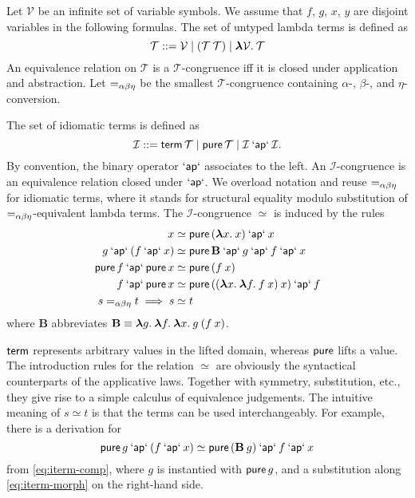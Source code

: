 \begin{definition}
Let $\mathcal{V}$ be an infinite set of variable symbols.
We assume that $f$, $g$, $x$, $y$ are disjoint variables in the following
formulas.
The set of untyped lambda terms is defined as
\begin{equation}
	\mathcal{T} ::= \mathcal{V} \mid (\mathcal{T} \> \mathcal{T}) \mid
		{\boldsymbol\lambda} \mathcal{V}.\>\mathcal{T}
\end{equation}
An equivalence relation on $\mathcal{T}$ is a $\mathcal{T}$-congruence iff it
is closed under application and abstraction.
Let $=_{\alpha\beta\eta}$ be the smallest $\mathcal{T}$-congruence containing $\alpha$-,
$\beta$-, and $\eta$-conversion.
\end{definition}

\begin{definition}\label{def:idiomatic-terms}
The set of idiomatic terms is defined as
\begin{equation}
	\mathcal{I} ::= \operatorname{\mathsf{term}} \mathcal{T} \mid \operatorname{\mathsf{pure}} \mathcal{T} \mid
		\mathcal{I} \mathbin{\mathsf{`ap`}} \mathcal{I}.
\end{equation}
By convention, the binary operator $\mathbin{\mathsf{`ap`}}$ associates to the left.
An $\mathcal{I}$-congruence is an equivalence relation closed under $\mathbin{\mathsf{`ap`}}$.
We overload notation and reuse $=_{\alpha\beta\eta}$ for idiomatic terms, where it stands
for structural equality modulo substitution of $=_{\alpha\beta\eta}$-equivalent lambda
terms.
The $\mathcal{I}$-congruence $\simeq$ is induced by the rules
\begin{align}
	x &\simeq \operatorname{\mathsf{pure}}{({\boldsymbol\lambda} x.\>x)} \mathbin{\mathsf{`ap`}} x \label{eq:iterm-id}\\
	g \mathbin{\mathsf{`ap`}} (f \mathbin{\mathsf{`ap`}} x) &\simeq \operatorname{\mathsf{pure}} \mathbf{B} \mathbin{\mathsf{`ap`}} g \mathbin{\mathsf{`ap`}} f \mathbin{\mathsf{`ap`}} x \label{eq:iterm-comp}\\
	\operatorname{\mathsf{pure}} f \mathbin{\mathsf{`ap`}} \operatorname{\mathsf{pure}} x &\simeq \operatorname{\mathsf{pure}}{(f \> x)} \label{eq:iterm-morph}\\
	f \mathbin{\mathsf{`ap`}} \operatorname{\mathsf{pure}} x &\simeq \operatorname{\mathsf{pure}}{(({\boldsymbol\lambda} x.\>{\boldsymbol\lambda} f.\>f \> x) \> x)} \mathbin{\mathsf{`ap`}} f \label{eq:iterm-xchng}\\
	s =_{\alpha\beta\eta} t \implies s &\simeq t \label{eq:termeq-lift}
\end{align}
where $\mathbf{B}$ abbreviates
$\mathbf{B} \equiv {\boldsymbol\lambda} g.\>{\boldsymbol\lambda} f.\>{\boldsymbol\lambda} x.\>g \> (f \> x)$.
\end{definition}

$\operatorname{\mathsf{term}}$ represents arbitrary values in the lifted domain, whereas $\operatorname{\mathsf{pure}}$
lifts a value.
The introduction rules for the relation $\simeq$ are obviously the syntactical
counterparts of the applicative laws.
Together with symmetry, substitution, etc., they give rise to a simple
calculus of equivalence judgements.
The intuitive meaning of $s \simeq t$ is that the terms can be used
interchangeably.
For example, there is a derivation for
\begin{equation}\label{eq:pure-rotate}
	\operatorname{\mathsf{pure}} g \mathbin{\mathsf{`ap`}} (f \mathbin{\mathsf{`ap`}} x) \simeq \operatorname{\mathsf{pure}}{(\mathbf{B} \> g)} \mathbin{\mathsf{`ap`}} f \mathbin{\mathsf{`ap`}} x
\end{equation}
from \eqref{eq:iterm-comp}, where $g$ is instantied with $\operatorname{\mathsf{pure}} g$, and a
substitution along \eqref{eq:iterm-morph} on the right-hand side.

